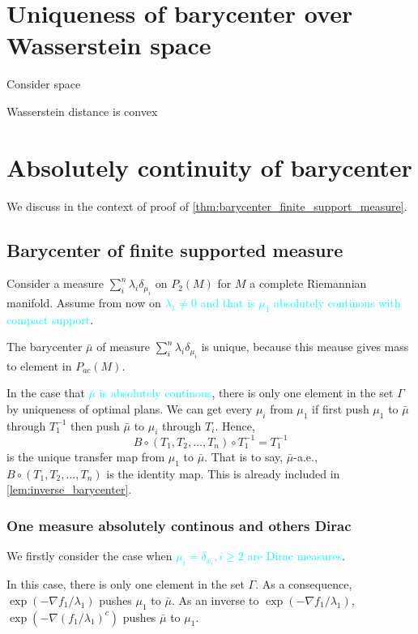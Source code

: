 \section{Uniqueness of barycenter over Wasserstein space}

Consider space

Wasserstein distance is convex
\section{Absolutely continuity of barycenter}

We discuss in the context of proof of \cref{thm:barycenter_finite_support_measure}.

\subsection{Barycenter of finite supported measure}

Consider a measure $\sum_{i}^{n} \lambda_{i} \delta_{\mu_i}$ on $P_{2}(M)$ for $M$ a complete Riemannian manifold.
Assume from now on \textcolor{cyan}{$ \lambda_1 \neq 0$ and
	that is $\mu_1$ absolutely continous with compact support}.


The barycenter $\bar{\mu}$ of measure $\sum_{i}^{n} \lambda_{i} \delta_{\mu_i}$ is unique,
because this meause gives mass to element in $P_{ac}(M)$.

In the case that \textcolor{cyan}{$\bar{\mu}$ is absolutely continous},
there is only one element in the set $\Gamma$ by uniqueness of optimal plans.
We can get every $\mu_i$ from $\mu_1$ if first push $\mu_1$ to $\bar{\mu}$ through $T_1^{-1}$ then push $\bar{\mu}$ to $\mu_i$ through $T_i$. Hence,
\[B \circ (T_1, T_2, \ldots, T_n) \circ T_1^{-1} = T_1^{-1}\]
is the unique transfer map from $\mu_1$ to $\bar{\mu}$. That is to say, $\bar{\mu}$-a.e., $B \circ (T_1, T_2, \ldots, T_n) $ is the identity map.
This is already included in \cref{lem:inverse_barycenter}.

\subsubsection{One measure absolutely continous and others Dirac}
We firstly consider the case when \textcolor{cyan}{$\mu_i = \delta_{x_i}, i \geq 2$ are Dirac measures}.

In this case, there is only one element in the set $\Gamma$.
As a consequence, $\exp(-\nabla f_1 / \lambda_1)$ pushes $\mu_1$ to $\bar{\mu}$.
As an inverse to $\exp(-\nabla f_1/\lambda_1)$,
\(\exp(-\nabla(f_1/\lambda_1)^c)\) pushes $\bar{\mu}$ to $\mu_1$.

